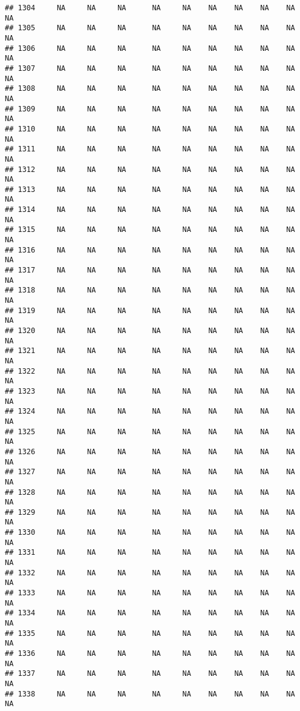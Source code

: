 \documentclass{article}\usepackage{graphicx, color}
\makeatletter
\newenvironment{kframe}{%
 \def\at@end@of@kframe{}%
 \ifinner\ifhmode%
  \def\at@end@of@kframe{\end{minipage}}%
  \begin{minipage}{\columnwidth}%
 \fi\fi%
 \def\FrameCommand##1{\hskip\@totalleftmargin \hskip-\fboxsep
 \colorbox{shadecolor}{##1}\hskip-\fboxsep
     \hskip-\linewidth \hskip-\@totalleftmargin \hskip\columnwidth}%
 \MakeFramed {\advance\hsize-\width
   \@totalleftmargin\z@ \linewidth\hsize
   \@setminipage}}%
 {\par\unskip\endMakeFramed%
 \at@end@of@kframe}
\newenvironment{knitrout}{}{} %
\makeatother
\begin{document}
\begin{knitrout}
\begin{kframe}
\begin{verbatim}
## 1304     NA     NA     NA      NA     NA    NA    NA    NA    NA     NA
## 1305     NA     NA     NA      NA     NA    NA    NA    NA    NA     NA
## 1306     NA     NA     NA      NA     NA    NA    NA    NA    NA     NA
## 1307     NA     NA     NA      NA     NA    NA    NA    NA    NA     NA
## 1308     NA     NA     NA      NA     NA    NA    NA    NA    NA     NA
## 1309     NA     NA     NA      NA     NA    NA    NA    NA    NA     NA
## 1310     NA     NA     NA      NA     NA    NA    NA    NA    NA     NA
## 1311     NA     NA     NA      NA     NA    NA    NA    NA    NA     NA
## 1312     NA     NA     NA      NA     NA    NA    NA    NA    NA     NA
## 1313     NA     NA     NA      NA     NA    NA    NA    NA    NA     NA
## 1314     NA     NA     NA      NA     NA    NA    NA    NA    NA     NA
## 1315     NA     NA     NA      NA     NA    NA    NA    NA    NA     NA
## 1316     NA     NA     NA      NA     NA    NA    NA    NA    NA     NA
## 1317     NA     NA     NA      NA     NA    NA    NA    NA    NA     NA
## 1318     NA     NA     NA      NA     NA    NA    NA    NA    NA     NA
## 1319     NA     NA     NA      NA     NA    NA    NA    NA    NA     NA
## 1320     NA     NA     NA      NA     NA    NA    NA    NA    NA     NA
## 1321     NA     NA     NA      NA     NA    NA    NA    NA    NA     NA
## 1322     NA     NA     NA      NA     NA    NA    NA    NA    NA     NA
## 1323     NA     NA     NA      NA     NA    NA    NA    NA    NA     NA
## 1324     NA     NA     NA      NA     NA    NA    NA    NA    NA     NA
## 1325     NA     NA     NA      NA     NA    NA    NA    NA    NA     NA
## 1326     NA     NA     NA      NA     NA    NA    NA    NA    NA     NA
## 1327     NA     NA     NA      NA     NA    NA    NA    NA    NA     NA
## 1328     NA     NA     NA      NA     NA    NA    NA    NA    NA     NA
## 1329     NA     NA     NA      NA     NA    NA    NA    NA    NA     NA
## 1330     NA     NA     NA      NA     NA    NA    NA    NA    NA     NA
## 1331     NA     NA     NA      NA     NA    NA    NA    NA    NA     NA
## 1332     NA     NA     NA      NA     NA    NA    NA    NA    NA     NA
## 1333     NA     NA     NA      NA     NA    NA    NA    NA    NA     NA
## 1334     NA     NA     NA      NA     NA    NA    NA    NA    NA     NA
## 1335     NA     NA     NA      NA     NA    NA    NA    NA    NA     NA
## 1336     NA     NA     NA      NA     NA    NA    NA    NA    NA     NA
## 1337     NA     NA     NA      NA     NA    NA    NA    NA    NA     NA
## 1338     NA     NA     NA      NA     NA    NA    NA    NA    NA     NA

\end{verbatim}
\end{kframe}
\end{knitrout}
\end{document}
